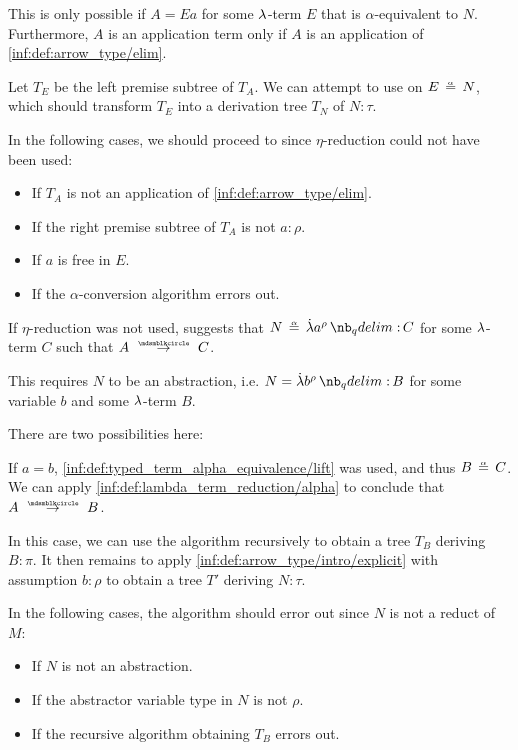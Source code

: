 \begin{algorithm}
\begin{thmenum}
\begin{thmenum}
      This is only possible if \( A = Ea \) for some \( {\mathrm \lambda} \)-term \( E \) that is \( \alpha \)-equivalent to \( N \). Furthermore, \( A \) is an application term only if \( A \) is an application of \ref{inf:def:arrow_type/elim}.

      Let \( T_E \) be the left premise subtree of \( T_A \). We can attempt to use  on \( E \aequiv N \), which should transform \( T_E \) into a derivation tree \( T_N \) of \( N: \tau \).

      In the following cases, we should proceed to  since \( \eta \)-reduction could not have been used:
      \begin{itemize}
        \item If \( T_A \) is not an application of \ref{inf:def:arrow_type/elim}.
        \item If the right premise subtree of \( T_A \) is not \( a: \rho \).
        \item If \( a \) is free in \( E \).
        \item If the \( \alpha \)-conversion algorithm errors out.
      \end{itemize}

       If \( \eta \)-reduction was not used,  suggests that \( N \aequiv \qabs {a^\rho} C \) for some \( {\mathrm \lambda} \)-term \( C \) such that \( A \pred C \).

      This requires \( N \) to be an abstraction, i.e. \( N = \qabs {b^\rho} B \) for some variable \( b \) and some \( {\mathrm \lambda} \)-term \( B \).

      There are two possibilities here:
      \begin{thmenum}
         If \( a = b \), \ref{inf:def:typed_term_alpha_equivalence/lift} was used, and thus \( B \aequiv C \). We can apply \ref{inf:def:lambda_term_reduction/alpha} to conclude that \( A \pred B \).

        In this case, we can use the algorithm recursively to obtain a tree \( T_B \) deriving \( B: \pi \). It then remains to apply \ref{inf:def:arrow_type/intro/explicit} with assumption \( b: \rho \) to obtain a tree \( T' \) deriving \( N: \tau \).

        In the following cases, the algorithm should error out since \( N \) is not a reduct of \( M \):
        \begin{itemize}
          \item If \( N \) is not an abstraction.
          \item If the abstractor variable type in \( N \) is not \( \rho \).
          \item If the recursive algorithm obtaining \( T_B \) errors out.
        \end{itemize}


\end{thmenum}
\end{thmenum}
\end{thmenum}
\end{algorithm}
